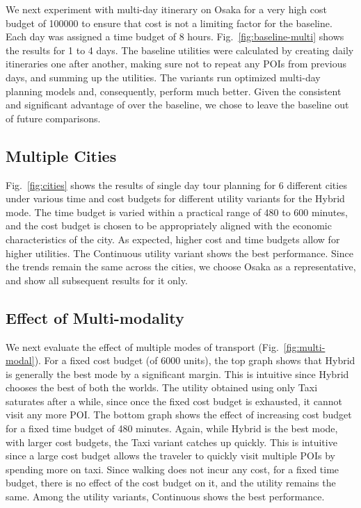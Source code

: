 We next experiment with multi-day itinerary on Osaka for a very high cost budget of 100000 to ensure that cost is not a limiting factor for the baseline.
Each day was assigned a time budget of 8 hours.
Fig.~\ref{fig:baseline-multi} shows the results for 1 to 4 days.
The baseline utilities were calculated by creating daily itineraries one after another, making sure not to repeat any POIs from previous days, and summing up the utilities.
The \trip variants run optimized multi-day planning models and, consequently, perform much better. Given the consistent and significant advantage of \trip over the baseline, we chose to leave the baseline out of future comparisons.

\subsection{Multiple Cities}

Fig.~\ref{fig:cities} shows the results of single day tour planning for 6 different cities under various time and cost budgets for different utility variants for the Hybrid mode.
The time budget is varied within a practical range of 480 to 600 minutes, and the cost budget is chosen to be appropriately aligned with the economic characteristics of the city.
As expected, higher cost and time budgets allow for higher utilities.
The Continuous utility variant shows the best performance.
Since the trends remain the same across the cities, we choose Osaka as a representative, and show all subsequent results for it only.

\subsection{Effect of Multi-modality}

We next evaluate the effect of multiple modes of transport (Fig.~\ref{fig:multi-modal}).
For a fixed cost budget (of 6000 units), the top graph shows that Hybrid is generally the best mode by a significant margin. This is intuitive since Hybrid chooses the best of both the worlds.
The utility obtained using only Taxi saturates after a while, since once the fixed cost budget is exhausted, it cannot visit any more POI.
The bottom graph shows the effect of increasing cost budget for a fixed time budget of 480 minutes.
Again, while Hybrid is the best mode, with larger cost budgets, the Taxi variant catches up quickly.
This is intuitive since a large cost budget allows the traveler to quickly visit multiple POIs by spending more on taxi.
Since walking does not incur any cost, for a fixed time budget, there is no effect of the cost budget on it, and the utility remains the same.
Among the utility variants, Continuous shows the best performance.

